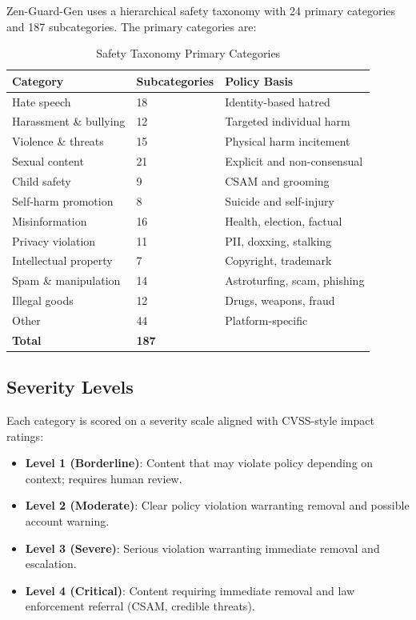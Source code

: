 \documentclass[11pt,a4paper]{article}
\begin{document}
Zen-Guard-Gen uses a hierarchical safety taxonomy with 24 primary categories and 187 subcategories. The primary categories are:

\begin{table}[H]
\centering
\caption{Safety Taxonomy Primary Categories}
\begin{tabular}{lll}
\toprule
\textbf{Category} & \textbf{Subcategories} & \textbf{Policy Basis} \\
\midrule
Hate speech & 18 & Identity-based hatred \\
Harassment \& bullying & 12 & Targeted individual harm \\
Violence \& threats & 15 & Physical harm incitement \\
Sexual content & 21 & Explicit and non-consensual \\
Child safety & 9 & CSAM and grooming \\
Self-harm promotion & 8 & Suicide and self-injury \\
Misinformation & 16 & Health, election, factual \\
Privacy violation & 11 & PII, doxxing, stalking \\
Intellectual property & 7 & Copyright, trademark \\
Spam \& manipulation & 14 & Astroturfing, scam, phishing \\
Illegal goods & 12 & Drugs, weapons, fraud \\
Other & 44 & Platform-specific \\
\midrule
\textbf{Total} & \textbf{187} & \\
\bottomrule
\end{tabular}
\end{table}

\subsection{Severity Levels}

Each category is scored on a severity scale aligned with CVSS-style impact ratings:

\begin{itemize}
  \item \textbf{Level 1 (Borderline)}: Content that may violate policy depending on context; requires human review.
  \item \textbf{Level 2 (Moderate)}: Clear policy violation warranting removal and possible account warning.
  \item \textbf{Level 3 (Severe)}: Serious violation warranting immediate removal and escalation.
  \item \textbf{Level 4 (Critical)}: Content requiring immediate removal and law enforcement referral (CSAM, credible threats).
\end{itemize}
\end{document}
